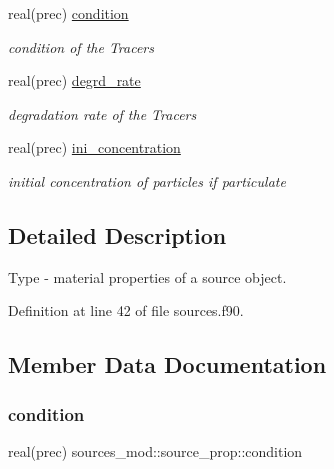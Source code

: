 \begin{DoxyCompactItemize}
real(prec) \mbox{\hyperlink{structsources__mod_1_1source__prop_a0276a57d6c2ebd9f6ce2c5c780b00b2f}{condition}}
\begin{DoxyCompactList}\small\item\em condition of the Tracers \end{DoxyCompactList}\item 
real(prec) \mbox{\hyperlink{structsources__mod_1_1source__prop_a6c302a7a21c554720641b4f377489794}{degrd\+\_\+rate}}
\begin{DoxyCompactList}\small\item\em degradation rate of the Tracers \end{DoxyCompactList}\item 
real(prec) \mbox{\hyperlink{structsources__mod_1_1source__prop_a1e3fba85e54d3fbab3b133507ce7e226}{ini\+\_\+concentration}}
\begin{DoxyCompactList}\small\item\em initial concentration of particles if particulate \end{DoxyCompactList}\end{DoxyCompactItemize}


\subsection{Detailed Description}
Type -\/ material properties of a source object. 

Definition at line 42 of file sources.\+f90.



\subsection{Member Data Documentation}
\mbox{\label{structsources__mod_1_1source__prop_a0276a57d6c2ebd9f6ce2c5c780b00b2f}} 
\subsubsection{\texorpdfstring{condition}{condition}}
{\footnotesize\ttfamily real(prec) sources\+\_\+mod\+::source\+\_\+prop\+::condition\hspace{0.3cm}{\ttfamily [private]}}



